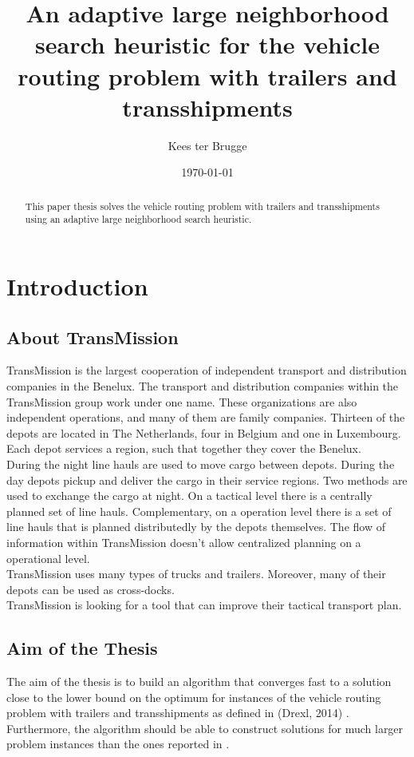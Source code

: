 \documentclass[a4paper]{article}
\title{An adaptive large neighborhood search heuristic for the vehicle routing problem with trailers and transshipments}
\author{Kees ter Brugge}
\date{\today}
\begin{document}
\maketitle

\begin{abstract}
This paper thesis solves the vehicle routing problem with trailers and transshipments using an adaptive large neighborhood search heuristic. 
\end{abstract}

\newpage
\tableofcontents 

\newpage
\section{Introduction}

\subsection{About TransMission}
TransMission is the largest cooperation of independent transport and distribution companies in the Benelux. The transport and distribution companies within the TransMission group work under one name. These organizations are also independent operations, and many of them are family companies. Thirteen of the depots are located in The Netherlands, four in Belgium and one in Luxembourg. Each depot services a region, such that together they cover the Benelux. \\
During the night line hauls are used to move cargo between depots. During the day depots pickup and deliver the cargo in their service regions. Two methods are used to exchange the cargo at night. On a tactical level there is a centrally planned set of line hauls. Complementary, on a operation level there is a set of line hauls that is planned distributedly by the depots themselves. The flow of information within TransMission doesn't allow centralized planning on a operational level. \\
TransMission uses many types of trucks and trailers. Moreover, many of their depots can be used as cross-docks.\\  
TransMission is looking for a tool that can improve their tactical transport plan.
\subsection{Aim of the Thesis}
The aim of the thesis is to build an algorithm that converges fast to a solution close to the lower bound on the optimum for instances of the vehicle routing problem with trailers and transshipments as defined in (Drexl, 2014) \cite{drexl2014bandc}. Furthermore, the algorithm should be able to construct solutions for much larger problem instances than the ones reported in \cite{drexl2014bandc}.
\end{document}
